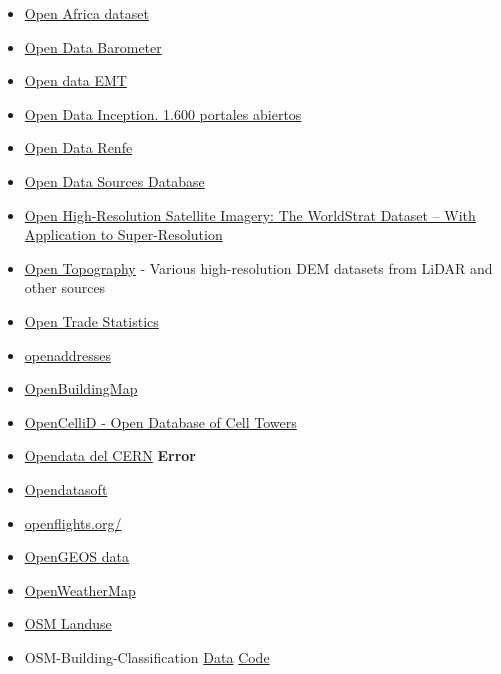 \documentclass[
  letterpaper,
  DIV=11,
  numbers=noendperiod]{scrartcl}
\begin{document}
\begin{itemize}
  collected by individuals and organizations.
\item
  \href{https://open.africa/dataset}{Open Africa dataset}
\item
  \href{https://opendatabarometer.org/?_year=2017&indicator=ODB}{Open
  Data Barometer}
\item
  \href{http://opendata.emtmadrid.es/}{Open data EMT}
\item
  \href{http://wwwhatsnew.com/2016/03/19/open-data-inception-recopilacion-de-1600-portales-de-datos-abiertos/?utm_content=buffer4e4d4&utm_medium=social&utm_source=linkedin.com&utm_campaign=buffer}{Open
  Data Inception. 1.600 portales abiertos}
\item
  \href{https://data.renfe.com/}{Open Data Renfe}
\item
  \href{https://anthonyhuntley.com/data-science-databases/\#DataSourceDatabase}{Open
  Data Sources Database}
\item
  \href{https://arxiv.org/abs/2207.06418}{Open High-Resolution Satellite
  Imagery: The WorldStrat Dataset -- With Application to
  Super-Resolution}
\item
  \href{https://opentopography.org/}{Open Topography} - Various
  high-resolution DEM datasets from LiDAR and other sources
\item
  \href{https://tradestatistics.io/}{Open Trade Statistics}
\item
  \href{https://openaddresses.io/}{openaddresses}
\item
  \href{https://git.gfz-potsdam.de/globaldynamicexposure/openbuildingmap}{OpenBuildingMap}
\item
  \href{https://www.opencellid.org/downloads.php}{OpenCelliD - Open
  Database of Cell Towers}
\item
  \href{http://opendata.cern.ch/}{Opendata del CERN} \textbf{Error}
\item
  \href{https://documentation-resources.opendatasoft.com/explore/?sort=modified}{Opendatasoft}
\item
  \href{https://openflights.org/}{openflights.org/}
\item
  \href{https://github.com/opengeos/data}{OpenGEOS data}
\item
  \href{https://openweathermap.org/api}{OpenWeatherMap}
\item
  \href{https://osmlanduse.org/}{OSM Landuse}
\item
  OSM-Building-Classification \href{https://osf.io/utgae/}{Data}
  \href{https://github.com/gmuggs/OSM-Building-Classification}{Code}

\end{itemize}
\end{document}
